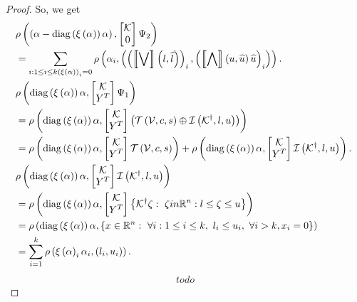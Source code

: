 \begin{proof}
So, we get
%
\begin{align}
& \supp{\lt(\alpha-\diagonal{\ind{\alpha}}\alpha\rt)}{\mymatrix{\qtemp \\
0}\Psi_2}\nonumber\\
& =\sum_{i:1\leq i\leq
k\lt(\ind{\alpha}\rt)_i=0}\supp{\alpha_i}{\lt(\lt(\maxapprox{\lb}{\plb}\rt)_i,\lt(\minapprox{\ub}{\pub}\pub\rt)_i\rt)}.~\label{proof-supp3}\\
& \supp{\diagonal{\ind{\alpha}}\alpha}{\mymatrix{\qtemp \\
Y^T}\Psi_1}\nonumber\\
& =\supp{\diagonal{\ind{\alpha}}\alpha}{\mymatrix{\qtemp \\
Y^T}\lt(\tcztope{\ptemp}{\cen}{\sfact}\oplus\iztope{\pinv{\qtemp}}{\lb}{\ub}\rt)}\nonumber\\
& =\supp{\diagonal{\ind{\alpha}}\alpha}{\mymatrix{\qtemp \\
Y^T}\tcztope{\ptemp}{\cen}{\sfact}}+\supp{\diagonal{\ind{\alpha}}\alpha}{\mymatrix{\qtemp \\
Y^T}\iztope{\pinv{\qtemp}}{\lb}{\ub}}.~\label{proof-supp4}\\
& \supp{\diagonal{\ind{\alpha}}\alpha}{\mymatrix{\qtemp \\
Y^T}\iztope{\pinv{\qtemp}}{\lb}{\ub}}\nonumber\\
& = \supp{\diagonal{\ind{\alpha}}\alpha}{\mymatrix{\qtemp \\
Y^T}\set{\pinv{\qtemp} \zeta:~\zeta in\reals^n:\lb\leq \zeta\leq\ub}}\nonumber\\
& = \supp{\diagonal{\ind{\alpha}}\alpha}{\set{x\in\reals^n:~\forall i:
1\leq i\leq k,~\lb_i\leq \ub_i,~\forall i>k,x_i=0}}\nonumber\\
&
= \sum_{i=1}^k\supp{\ind{\alpha}_i\alpha_i}{\lt(\lb_i,\ub_i\rt)}.~\label{proof-supp5}
\end{align}
%
\begin{align}
todo
\end{align}
%
\end{proof}
%




























